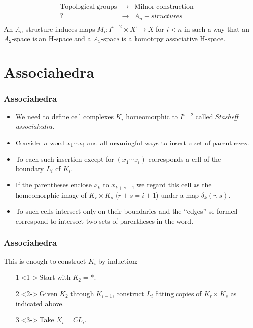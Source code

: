 \documentclass{beamer}
\theoremstyle{definition}
\begin{document}
\begin{frame}
\[
\begin{array}{ccc}
\text{Topological groups} & \rightarrow & \text{Milnor construction}\\
? & \rightarrow  & A_n-structures\\
& &
\end{array}
\]
\pause
An $A_n$-structure induces maps $M_i:I^{i-2}\times X^i\to X$ for $i<n$ in such a way that an $A_2$-space is an H-space and a $A_3$-space is a homotopy associative H-space. %
\end{frame}
\section{Associahedra}
\begin{frame}
\frametitle{Associahedra}
\begin{itemize}
\item<1->We need to define cell complexes $K_i$ homeomorphic to $I^{i-2}$ called \emph{Stasheff associahedra}. %
\item<2-> Consider a word $x_1\cdots x_i$ and all meaningful ways to insert a set of parentheses.
\item<3-> To each such insertion except for $(x_1\cdots x_i)$ corresponds a cell of the boundary $L_i$ of $K_i$.
\item<4-> If the parentheses enclose $x_k$ to $x_{k+s-1}$ we regard this cell as the homeomorphic image of $K_r\times K_s$ ($r+s=i+1$) under a map $\delta_k(r,s)$.
\item<5-> To such cells intersect only on their boundaries and the ``edges'' so formed correspond to intersect two sets of parentheses in the word. %
 \end{itemize}
\end{frame}



\begin{frame}
\frametitle{Associahedra}
This is enough to construct $K_i$ by induction:
\begin{itemize}
\item[1]<1-> Start with $K_2=*$.
\item[2]<2-> Given $K_2$ through $K_{i-1}$, construct $L_i$ fitting copies of $K_r\times K_s$ as indicated above.
\item[3]<3-> Take $K_i=CL_i$.
\end{itemize}
\end{frame}
\end{document}
